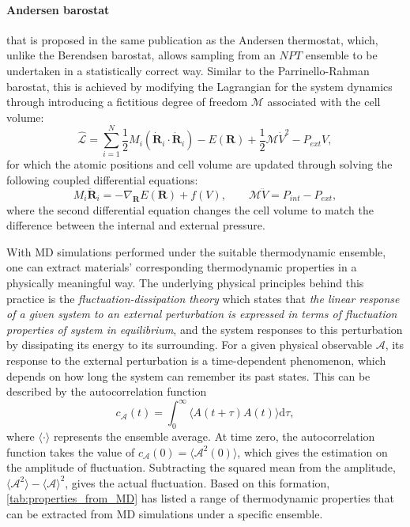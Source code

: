 \paragraph{\textbf{Andersen barostat}} that is proposed in the same publication as the Andersen thermostat,\cite{andersen1980molecular} which, unlike the Berendsen barostat, allows sampling from an $NPT$ ensemble to be undertaken in a statistically correct way. Similar to the Parrinello-Rahman barostat, this is achieved by modifying the Lagrangian for the system dynamics through introducing a fictitious degree of freedom $\mathcal{M}$ associated with the cell volume:
\begin{equation}
    \label{eq:andersen_lagrangian}
    \hat{\mathcal{L}}=\sum_{i=1}^{N}\frac{1}{2}M_i \left(\dot{\bm{R}}_i \cdot\dot{\bm{R}}_i\right)-E(\bm{R})+\frac{1}{2}\mathcal{M}\dot{V}^2-P_{ext}V,
\end{equation}
for which the atomic positions and cell volume are updated through solving the following coupled differential equations:
\begin{equation}
    \label{eq:andersen_coupled_ODE}
    M_i\ddot{\bm{R}}_i=-\nabla_{\bm{R}}E(\bm{R})+f(V), \qquad \mathcal{M}\ddot{V}=P_{int}-P_{ext},
\end{equation}
where the second differential equation changes the cell volume to match the difference between the internal and external pressure.

With MD simulations performed under the suitable thermodynamic ensemble, one can extract materials' corresponding thermodynamic properties in a physically meaningful way. The underlying physical principles behind this practice is the \emph{fluctuation-dissipation theory}\cite{kubo1966fluctuation} which states that \emph{the linear response of a given system to an external perturbation is expressed in terms of fluctuation properties of system in equilibrium}, and the system responses to this perturbation by dissipating its energy to its surrounding. For a given physical observable $\mathcal{A}$, its response to the external perturbation is a time-dependent phenomenon, which depends on how long the system can remember its past states. This can be described by the autocorrelation function
\begin{equation}
    \label{eq:autocorrelations}
    c_\mathcal{A}(t)=\int_{0}^{\infty}\langle A(t+\tau)A(t)\rangle \mathrm{d}\tau,
\end{equation}
where $\langle\cdot\rangle$ represents the ensemble average. At time zero, the autocorrelation function takes the value of $c_{\mathcal{A}}(0)=\langle\mathcal{A}^2(0)\rangle$, which gives the estimation on the amplitude of fluctuation. Subtracting the squared mean from the amplitude, $\langle\mathcal{A}^2\rangle-\langle\mathcal{A}\rangle^2$, gives the actual fluctuation. Based on this formation, \cref{tab:properties_from_MD} has listed a range of thermodynamic properties that can be extracted from MD simulations under a specific ensemble.

